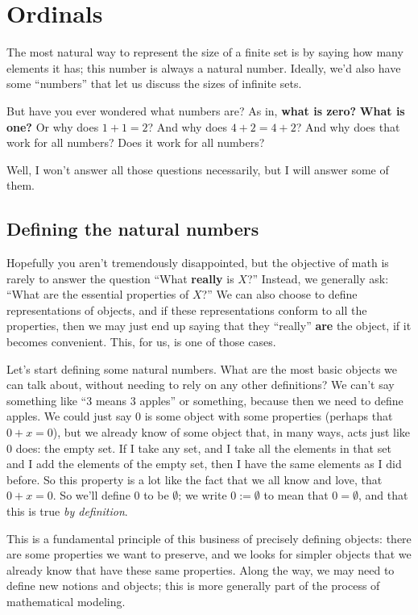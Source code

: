 \section{Ordinals}

The most natural way to represent the size of a finite set is by saying how many elements it has; this number is always a natural number.
Ideally, we'd also have some ``numbers'' that let us discuss the sizes of infinite sets.

But have you ever wondered what numbers are?
As in, \textbf{what is zero?}
\textbf{What is one?}
Or why does $1 + 1 = 2$?
And why does $4 + 2 = 4 + 2$?
And why does that work for all numbers?
Does it work for all numbers?

Well, I won't answer all those questions necessarily, but I will answer some of them.

\subsection{Defining the natural numbers}

Hopefully you aren't tremendously disappointed, but the objective of math is rarely to answer the question ``What \textbf{really} is $X$?''
Instead, we generally ask: ``What are the essential properties of $X$?''
We can also choose to define representations of objects, and if these representations conform to all the properties, then we may just end up saying that they ``really'' \textbf{are} the object, if it becomes convenient.
This, for us, is one of those cases.

Let's start defining some natural numbers.
What are the most basic objects we can talk about, without needing to rely on any other definitions?
We can't say something like ``$3$ means $3$ apples'' or something, because then we need to define apples.
We could just say $0$ is some object with some properties (perhaps that $0 + x = 0$), but we already know of some object that, in many ways, acts just like $0$ does: the empty set.
If I take any set, and I take all the elements in that set and I add the elements of the empty set, then I have the same elements as I did before.
So this property is a lot like the fact that we all know and love, that $0 + x = 0$.
So we'll define $0$ to be $\emptyset$; we write $0 := \emptyset$ to mean that $0 = \emptyset$, and that this is true \emph{by definition}.

This is a fundamental principle of this business of precisely defining objects: there are some properties we want to preserve, and we looks for simpler objects that we already know that have these same properties.
Along the way, we may need to define new notions  and objects; this is more generally part of the process of mathematical modeling.

